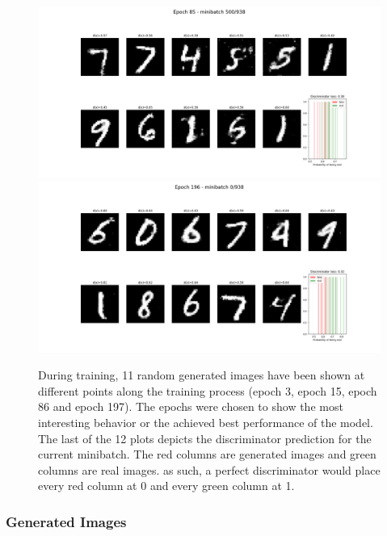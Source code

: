 \documentclass[11pt, fleqn, titlepage]{article}
\newcommand{\1}[1]{\mathds{1}\left[#1\right]}
\begin{document}
\begin{figure}[H]
	\includegraphics[width=\linewidth]{imgs/MNIST_GAN_mse_result_epoch_84_minibatch_500}
	\hfill
	\includegraphics[width=\linewidth]{imgs/MNIST_GAN_mse_result_epoch_195_minibatch_0}
	\caption{During training, 11 random generated images have been shown at different points along the training process (epoch 3, epoch 15, epoch 86 and epoch 197). The epochs were chosen to show the most interesting behavior or the achieved best performance of the model. The last of the 12 plots depicts the discriminator prediction for the current minibatch. The red columns are generated images and green columns are real images. as such, a perfect discriminator would place every red column at 0 and every green column at 1.}
		\label{fig:training_progress_mse}
\end{figure}

\subsubsection{Generated Images}
\end{document}

